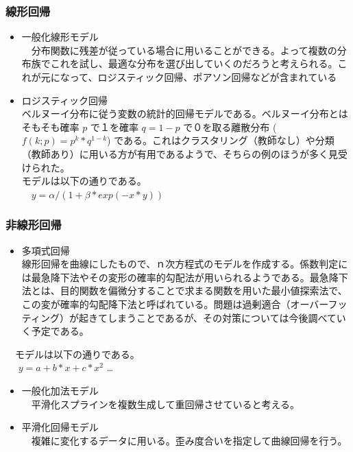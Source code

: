 \documentclass{scrartcl}
\begin{document}
\subsubsection{線形回帰}
\label{sec:org40e65cf}
\begin{itemize}
\item 一般化線形モデル\\
　分布関数に残差が従っている場合に用いることができる。よって複数の分布族でこれを試し、最適な分布を選び出していくのだろうと考えられる。これが元になって、ロジスティック回帰、ポアソン回帰などが含まれている\\
\item ロジスティック回帰\\
ベルヌーイ分布に従う変数の統計的回帰モデルである。ベルヌーイ分布とはそもそも確率 \(p\) で１を確率 \(q=1-p\) で０を取る離散分布 (\(f(k;p)=p^k*q^{1-k}\)) である。これはクラスタリング（教師なし）や分類（教師あり）に用いる方が有用であるようで、そちらの例のほうが多く見受けられた。\\
モデルは以下の通りである。\\
　\(y = \alpha / (1 + \beta * exp(-x*y) )\)\\
\end{itemize}
\subsubsection{非線形回帰}
\label{sec:orgda07480}
\begin{itemize}
\item 多項式回帰\\
線形回帰を曲線にしたもので、ｎ次方程式のモデルを作成する。係数判定には最急降下法やその変形の確率的勾配法が用いられるようである。最急降下法とは、目的関数を偏微分することで求まる関数を用いた最小値探索法で、この変が確率的勾配降下法と呼ばれている。問題は過剰適合（オーバーフッティング）が起きてしまうことであるが、その対策については今後調べていく予定である。\\
\end{itemize}
　モデルは以下の通りである。\\
　 \(y = a + b*x + c*x^2\) \ldots{}\\
\begin{itemize}
\item 一般化加法モデル\\
　平滑化スプラインを複数生成して重回帰させていると考える。\\
\item 平滑化回帰モデル\\
　複雑に変化するデータに用いる。歪み度合いを指定して曲線回帰を行う。\\
\end{itemize}
\end{document}
